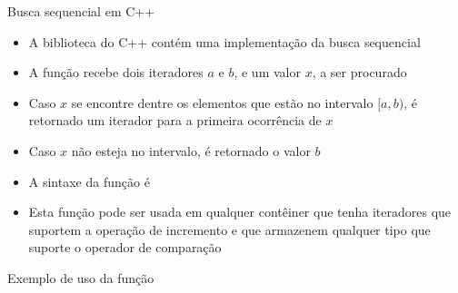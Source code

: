 \begin{frame}[fragile]{Busca sequencial em C++}

    \begin{itemize}
        \item A biblioteca  do C++ contém uma implementação da busca
            sequencial

        \item A função  recebe dois iteradores $a$ e $b$, e um valor $x$, a
            ser procurado

        \item Caso $x$ se encontre dentre os elementos que estão no intervalo $[a, b)$, é
            retornado um iterador para a primeira ocorrência de $x$

        \item Caso $x$ não esteja no intervalo, é retornado o valor $b$

        \item A sintaxe da função  é

        \item Esta função pode ser usada em qualquer contêiner que tenha iteradores que suportem
            a operação de incremento e que armazenem qualquer tipo que suporte o operador de
            comparação 
    \end{itemize}

\end{frame}

\begin{frame}[fragile]{Exemplo de uso da função }
\end{frame}

